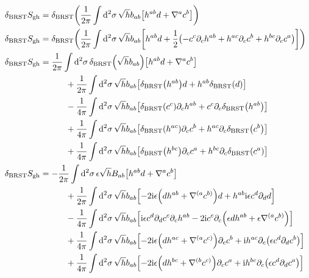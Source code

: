 \begin{align*}
    \delta_{\textnormal{BRST}}S_{\textnormal{gh}}&=\delta_{\textnormal{BRST}}\qty(\frac{1}{2\pi}\int\dd[2]{\sigma}\sqrt{h}b_{ab}\qty[h^{ab}d+\nabla^{a}c^{b}])\\
    \delta_{\textnormal{BRST}}S_{\textnormal{gh}}&=\delta_{\textnormal{BRST}}\qty(\frac{1}{2\pi}\int\dd[2]{\sigma}\sqrt{h}b_{ab}\qty[h^{ab}d+\frac12\qty(-c^c\partial_ch^{ab}+h^{ac}\partial_cc^b+h^{bc}\partial_cc^a)])\\
    \delta_{\textnormal{BRST}}S_{\textnormal{gh}}&=\frac{1}{2\pi}\int\dd[2]{\sigma}\delta_{\textnormal{BRST}}\qty(\sqrt{h}b_{ab})\qty[h^{ab}d+\nabla^ac^b]\\
    &\quad\quad\quad+\frac{1}{2\pi}\int\dd[2]{\sigma}\sqrt{h}b_{ab}\qty[\delta_{\textnormal{BRST}}\qty(h^{ab})d+h^{ab}\delta_{\textnormal{BRST}}\qty(d)]\\
    &\quad\quad\quad-\frac{1}{4\pi}\int\dd[2]{\sigma}\sqrt{h}b_{ab}\qty[\delta_{\textnormal{BRST}}\qty(c^c)\partial_ch^{ab}+c^c\partial_c\delta_{\textnormal{BRST}}\qty(h^{ab})]\\
    &\quad\quad\quad+\frac{1}{4\pi}\int\dd[2]{\sigma}\sqrt{h}b_{ab}\qty[\delta_{\textnormal{BRST}}\qty(h^{ac})\partial_cc^b+h^{ac}\partial_c\delta_{\textnormal{BRST}}\qty(c^b)]\\
    &\quad\quad\quad+\frac{1}{4\pi}\int\dd[2]{\sigma}\sqrt{h}b_{ab}\qty[\delta_{\textnormal{BRST}}\qty(h^{bc})\partial_cc^a+h^{bc}\partial_c\delta_{\textnormal{BRST}}\qty(c^a)]\\
    \delta_{\textnormal{BRST}}S_{\textnormal{gh}}&=-\frac{1}{2\pi}\int\dd[2]{\sigma}\epsilon\sqrt{h}B_{ab}\qty[h^{ab}d+\nabla^ac^b]\\
    &\quad\quad\quad+\frac{1}{2\pi}\int\dd[2]{\sigma}\sqrt{h}b_{ab}\qty[-2\im\epsilon\qty(dh^{ab}+\nabla^{(a}c^{b)})d+h^{ab}\im\epsilon c ^d\partial_d d]\\
    &\quad\quad\quad-\frac{1}{4\pi}\int\dd[2]{\sigma}\sqrt{h}b_{ab}\qty[\im\epsilon c^d\partial_dc^c\partial_ch^{ab}-2\im c^c\partial_c\qty(\epsilon dh^{ab}+\epsilon\nabla^{(a}c^{b)})]\\
    &\quad\quad\quad+\frac{1}{4\pi}\int\dd[2]{\sigma}\sqrt{h}b_{ab}\qty[-2\im\epsilon\qty(dh^{ac}+\nabla^{(a}c^{c)})\partial_cc^b+\im h^{ac}\partial_c\qty(\epsilon c^d\partial_dc^b)]\\
    &\quad\quad\quad+\frac{1}{4\pi}\int\dd[2]{\sigma}\sqrt{h}b_{ab}\qty[-2\im\epsilon\qty(dh^{bc}+\nabla^{(b}c^{c)})\partial_cc^a+\im h^{bc}\partial_c\qty(\epsilon c^d\partial_d c^a)]\\

\end{align*}

